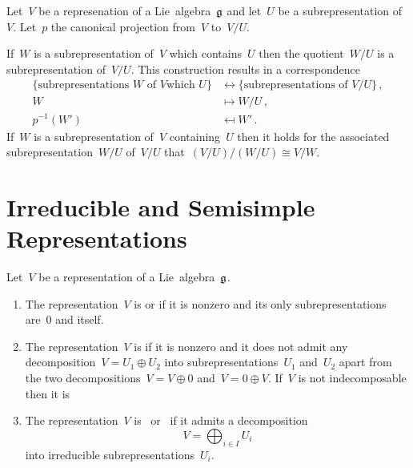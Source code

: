 \begin{proposition}
  \label{correspondence theorem!for representations}
  Let~$V$ be a represenation of a Lie~algebra~$\mathfrak{g}$ and let~$U$ be a subrepresentation of~$V$.
  Let~$p$ the canonical projection from~$V$ to~$V/U$.
  
  If~$W$ is a subrepresentation of~$V$ which contains~$U$ then the quotient~$W/U$ is a subrepresentation of~$V/U$.
  This construction results in a {\onetoonetext} correspondence
  \begin{align*}
    \{ \text{subrepresentations~$W$ of~$V$which~$U$} \}
    &\longleftrightarrow
    \{ \text{subrepresentations of~$V/U$} \}  \,,
    \\
    W
    &\mapsto
    W/U \,,
    \\
    p^{-1}(W')
    &\mapsfrom
    W'  \,.
  \end{align*}
  If~$W$ is a subrepresentation of~$V$ containing~$U$ then it holds for the associated subrepresentation~$W/U$ of~$V/U$ that~$(V/U)/(W/U) \cong V/W$.
\end{proposition}





\section{Irreducible and Semisimple Representations}


\begin{definition}
  Let~$V$ be a representation of a Lie~algebra~$\mathfrak{g}$.
  \begin{enumerate}
    \item
      The representation~$V$ is  or  if it is nonzero and its only subrepresentations are~$0$ and itself.
    \item
      The representation~$V$ is  if it is nonzero and it does not admit any decomposition~$V = U_1 \oplus U_2$ into subrepresentations~$U_1$ and~$U_2$ apart from the two decompositions~$V = V \oplus 0$ and~$V = 0 \oplus V$.
      If~$V$ is not indecomposable then it is 
    \item
      The representation~$V$ is~ or~ if it admits a decomposition
      \[
        V = \bigoplus_{i \in I} U_i
      \]
      into irreducible subrepresentations~$U_i$.
  \end{enumerate}
\end{definition}


